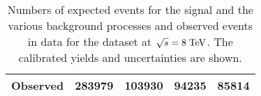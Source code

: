 \begin{table}
\begin{tabular}{ l  rrr  rrr  rrr  rrr }
    \midrule                                                                                                                                                      
    Observed              & \multicolumn{3}{c}{283979}        & \multicolumn{3}{c}{103930}      & \multicolumn{3}{c}{94235}        & \multicolumn{3}{c}{85814}       \\
    \bottomrule
  \end{tabular}
  \caption[Event yields for the \ejets{} samples at $\sqrt{s} = 8 \TeV{}$]{
    Numbers of expected events for the \ttbar{} signal and the various background 
    processes and observed events in data for the \ejets{} dataset
    at $\sqrt{s} = 8 \TeV{}$.
    The calibrated yields and uncertainties are shown.}
  \label{tab:yields2012ele}
\end{table}

